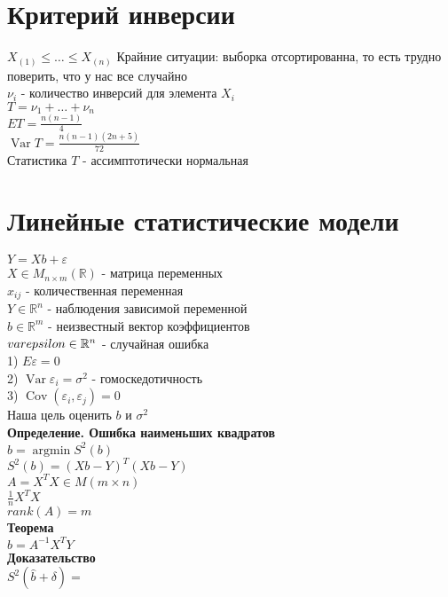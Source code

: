 \documentclass{article}
\newcommand\0{\mathbb{0}}
\DeclareMathOperator{\Var}{Var}
\DeclareMathOperator{\Cov}{Cov}
\DeclareMathOperator{\argmin}{argmin}
\newcommand\1{\mathbb{1}}
\renewcommand{\bf}{\textbf}
\begin{document}
\section{Критерий инверсии}
$X_{(1)} \leq \dots \leq X_{(n)}$
Крайние ситуации: выборка отсортированна, то есть трудно поверить, что у нас все случайно\\
$\nu_i$ - количество инверсий для элемента $X_i$\\
$T = \nu_1 + \dots + \nu_{n}$\\
$ET = \frac{n(n - 1)}{4}$\\
$\Var T = \frac{n(n - 1)(2n + 5)}{72}$\\
Статистика $T$ - ассимптотически нормальная\\
\section{Линейные статистические модели}
$Y = Xb + \varepsilon$\\
$X \in M_{n \times m}(\mathbb{R})$ - матрица переменных\\
$x_{ij}$ - количественная переменная\\
$Y \in \mathbb{R}^n$ - наблюдения зависимой переменной\\
$b \in \mathbb{R}^m$ - неизвестный вектор коэффициентов\\
$\\varepsilon \in \mathbb{R}^n$ - случайная ошибка\\
1) $E\varepsilon = 0$\\
2) $\Var \varepsilon_i = \sigma^2$ - гомоскедотичность\\
3) $\Cov(\varepsilon_i, \varepsilon_j) = 0$\\
Наша цель оценить $b$ и $\sigma^2$\\
\bf{Определение. Ошибка наименьших квадратов}\\
$\widehat{b} = \argmin S^2(b)$\\
$S^2(b) = (Xb - Y)^T(Xb - Y)$\\
$A = X^T X \in M(m \times n)$\\
$\frac{1}{n}X^T X$\\
$rank(A) = m$\\
\bf{Теорема}\\
$\widehat{b} = A^{-1}X^T Y$\\
\bf{Доказательство}\\
$S^2(\widehat{b} + \delta) = $ %
\end{document}
